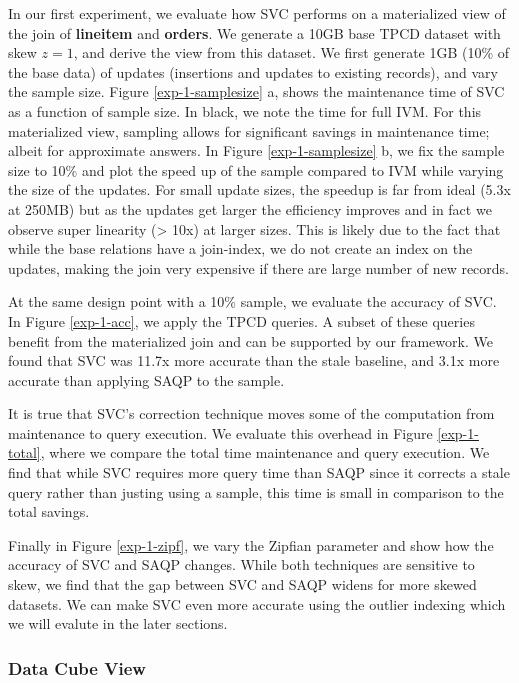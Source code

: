 In our first experiment, we evaluate how SVC performs on a materialized view of the join of \textbf{lineitem} and \textbf{orders}.
We generate a 10GB base TPCD dataset with skew $z=1$, and derive the view from this dataset.
We first generate 1GB (10\% of the base data) of updates (insertions and updates to existing records), and vary the sample size.
Figure \ref{exp-1-samplesize} a, shows the maintenance time of SVC as a function of sample size.
In black, we note the time for full IVM.
For this materialized view, sampling allows for significant savings in maintenance time; albeit for approximate answers.
In Figure \ref{exp-1-samplesize} b, we fix the sample size to 10\% and plot the speed up of the sample compared to IVM while varying the size of the updates.
For small update sizes, the speedup is far from ideal (5.3x at 250MB) but as the updates get larger the efficiency improves and in fact we observe super linearity (> 10x) at larger sizes.
This is likely due to the fact that while the base relations have a join-index, we do not create an index on the updates, making the join very expensive if there are large number of new records.

At the same design point with a 10\% sample, we evaluate the accuracy of SVC.
In Figure \ref{exp-1-acc}, we apply the TPCD queries.
A subset of these queries benefit from the materialized join and can be supported by our framework.
We found that SVC was 11.7x more accurate than the stale baseline, and 3.1x more accurate than applying SAQP to the sample.

It is true that SVC's correction technique moves some of the computation from maintenance to query execution.
We evaluate this overhead in Figure \ref{exp-1-total}, where we compare the total time maintenance and query execution.
We find that while SVC requires more query time than SAQP since it corrects a stale query rather than justing using a sample, 
this time is small in comparison to the total savings. 

Finally in Figure \ref{exp-1-zipf}, we vary the Zipfian parameter and show how the accuracy of SVC and SAQP changes.
While both techniques are sensitive to skew, we find that the gap between SVC and SAQP widens for more skewed datasets.
We can make SVC even more accurate using the outlier indexing which we will evalute in the later sections.

\subsubsection{Data Cube View}

